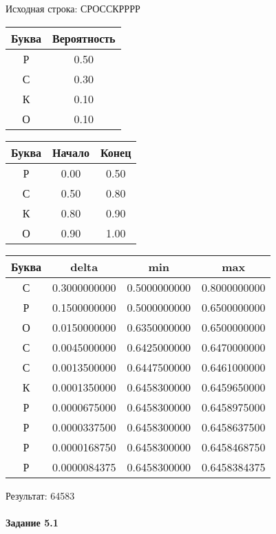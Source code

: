 \documentclass[a4paper, 12pt]{article}
\begin{document}
Исходная строка: СРОССКРРРР\
\begin{center}
 \begin{tabular}{ |c|c| } 
  \hline
     Буква & Вероятность \\ \hline
Р & 0.50\\\hline
С & 0.30\\\hline
К & 0.10\\\hline
О & 0.10
\\ \hline \end{tabular}
\end{center}
\begin{center}
 \begin{tabular}{ |c|c|c| } 
  \hline
     Буква & Начало & Конец \\ \hline
Р & 0.00 & 0.50\\\hline
С & 0.50 & 0.80\\\hline
К & 0.80 & 0.90\\\hline
О & 0.90 & 1.00
\\ \hline \end{tabular}
\end{center}
\begin{center}
 \begin{tabular}{ |c|c|c|c| } 
  \hline
     Буква & delta & min & max \\ \hline
С & 0.3000000000 & 0.5000000000 & 0.8000000000\\\hline
Р & 0.1500000000 & 0.5000000000 & 0.6500000000\\\hline
О & 0.0150000000 & 0.6350000000 & 0.6500000000\\\hline
С & 0.0045000000 & 0.6425000000 & 0.6470000000\\\hline
С & 0.0013500000 & 0.6447500000 & 0.6461000000\\\hline
К & 0.0001350000 & 0.6458300000 & 0.6459650000\\\hline
Р & 0.0000675000 & 0.6458300000 & 0.6458975000\\\hline
Р & 0.0000337500 & 0.6458300000 & 0.6458637500\\\hline
Р & 0.0000168750 & 0.6458300000 & 0.6458468750\\\hline
Р & 0.0000084375 & 0.6458300000 & 0.6458384375
\\ \hline \end{tabular}
\end{center}
Результат: 64583
\pagebreak
\paragraph{Задание 5.1}
\end{document}
